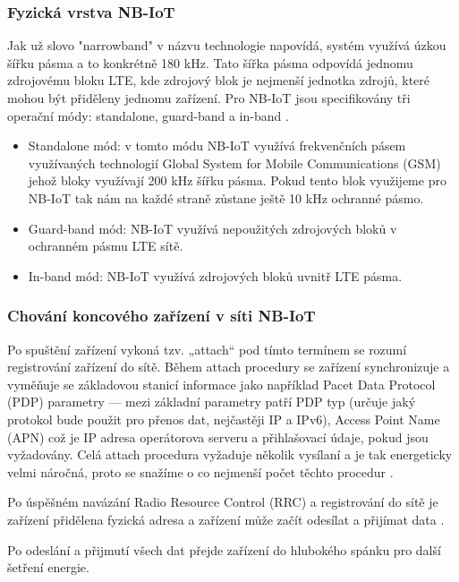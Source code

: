 \subsubsection{Fyzická vrstva NB-IoT}
\par Jak už slovo "narrowband" v názvu technologie napovídá, systém využívá úzkou šířku pásma a to konkrétně 180 kHz. Tato šířka pásma odpovídá jednomu zdrojovému bloku \acs{LTE}, kde zdrojový blok je nejmenší jednotka zdrojů, které mohou být přiděleny jednomu zařízení. Pro \acs{NB-IoT} jsou specifikovány tři operační módy: standalone, guard-band a in-band \cite{Schlienz882016}.
    \begin{itemize}
        \item Standalone mód: v tomto módu \acs{NB-IoT} využívá frekvenčních pásem využívaných technologií Global System for Mobile Communications (GSM) jehož bloky využívají 200 kHz šířku pásma. Pokud tento blok využijeme pro \acs{NB-IoT} tak nám na každé straně zůstane ještě 10 kHz ochranné pásmo.
        \item Guard-band mód: \acs{NB-IoT} využívá nepoužitých zdrojových bloků v ochranném pásmu \acs{LTE} sítě.
        \item In-band mód: \acs{NB-IoT} využívá zdrojových bloků uvnitř \acs{LTE} pásma.
    \end{itemize}

\subsubsection{Chování koncového zařízení v síti NB-IoT}
\par Po spuštění zařízení vykoná tzv. „attach“ pod tímto termínem se rozumí registrování zařízení do sítě. 
Během attach procedury se zařízení synchronizuje a vyměňuje se základovou stanicí informace jako například Pacet Data Protocol (PDP) parametry — mezi základní parametry patří \acs{PDP} typ (určuje jaký protokol bude použit pro přenos dat, nejčastěji \acs{IP} a \acs{IPv6}), Access Point Name (APN) což je \acs{IP} adresa operátorova serveru a přihlašovací údaje, pokud jsou vyžadovány. Celá attach procedura vyžaduje několik vysílaní a je tak energeticky velmi náročná, proto se snažíme o co nejmenší počet těchto procedur \cite{DWRNDjq4O4uDwB3Z}.
\par Po úspěšném navázání Radio Resource Control (RRC) a registrování do sítě je zařízení přidělena fyzická adresa a zařízení může začít odesílat a přijímat data \cite{Mozny2019}. 
\par Po odeslání a přijmutí všech dat přejde zařízení do hlubokého spánku pro další šetření energie.

